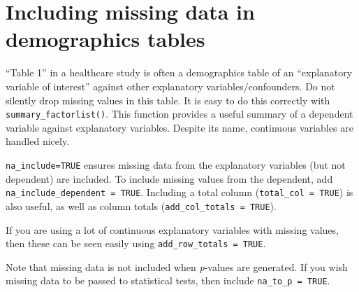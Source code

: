 \documentclass[
  12pt,
  krantz2]{krantz}
\makeatletter
\newenvironment{Shaded}{\begin{snugshade}}{\end{snugshade}}
\newcommand{\CommentTok}[1]{\textcolor[rgb]{0.56,0.35,0.01}{\textit{#1}}}
\newcommand{\DataTypeTok}[1]{\textcolor[rgb]{0.13,0.29,0.53}{#1}}
\newcommand{\KeywordTok}[1]{\textcolor[rgb]{0.13,0.29,0.53}{\textbf{#1}}}
\newcommand{\NormalTok}[1]{#1}
\newcommand{\OperatorTok}[1]{\textcolor[rgb]{0.81,0.36,0.00}{\textbf{#1}}}
\newcommand{\OtherTok}[1]{\textcolor[rgb]{0.56,0.35,0.01}{#1}}
\newcommand{\StringTok}[1]{\textcolor[rgb]{0.31,0.60,0.02}{#1}}
\newenvironment{kframe}{%
\medskip{}
\setlength{\fboxsep}{.8em}
 \def\at@end@of@kframe{}%
 \ifinner\ifhmode%
  \def\at@end@of@kframe{\end{minipage}}%
  \begin{minipage}{\columnwidth}%
 \fi\fi%
 \def\FrameCommand##1{\hskip\@totalleftmargin \hskip-\fboxsep
 \colorbox{shadecolor}{##1}\hskip-\fboxsep
     \hskip-\linewidth \hskip-\@totalleftmargin \hskip\columnwidth}%
 \MakeFramed {\advance\hsize-\width
   \@totalleftmargin\z@ \linewidth\hsize
   \@setminipage}}%
 {\par\unskip\endMakeFramed%
 \at@end@of@kframe}
\renewenvironment{Shaded}{\begin{kframe}}{\end{kframe}}
\makeatother
\begin{document}
\hypertarget{including-missing-data-in-demographics-tables}{%
\section{Including missing data in demographics tables}\label{including-missing-data-in-demographics-tables}}


``Table 1'' in a healthcare study is often a demographics table of an ``explanatory variable of interest'' against other explanatory variables/confounders.
Do not silently drop missing values in this table.
It is easy to do this correctly with \texttt{summary\_factorlist()}.
This function provides a useful summary of a dependent variable against explanatory variables.
Despite its name, continuous variables are handled nicely.

\texttt{na\_include=TRUE} ensures missing data from the explanatory variables (but not dependent) are included.
To include missing values from the dependent, add \texttt{na\_include\_dependent\ =\ TRUE}.
Including a total column (\texttt{total\_col\ =\ TRUE}) is also useful, as well as column totals (\texttt{add\_col\_totals\ =\ TRUE}).

If you are using a lot of continuous explanatory variables with missing values, then these can be seen easily using \texttt{add\_row\_totals\ =\ TRUE}.

Note that missing data is not included when \emph{p}-values are generated.
If you wish missing data to be passed to statistical tests, then include \texttt{na\_to\_p\ =\ TRUE}.

\begin{Shaded}
\end{Shaded}
\end{document}
